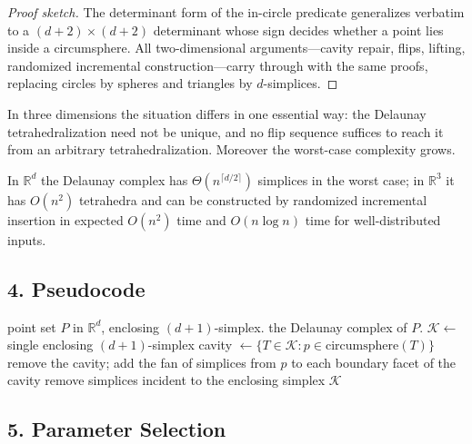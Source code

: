 \begin{proof}[Proof sketch]
The determinant form of the in-circle predicate generalizes verbatim to a
$(d+2) \times (d+2)$ determinant whose sign decides whether a point lies inside
a circumsphere. All two-dimensional arguments---cavity repair, flips, lifting,
randomized incremental construction---carry through with the same proofs,
replacing circles by spheres and triangles by $d$-simplices.
\end{proof}

In three dimensions the situation differs in one essential way: the Delaunay
tetrahedralization need not be unique, and no flip sequence suffices to reach
it from an arbitrary tetrahedralization. Moreover the worst-case complexity
grows.

\begin{theorem}\label{thm:high_dim_size}
In $\mathbb{R}^d$ the Delaunay complex has $\Theta(n^{\lceil d/2 \rceil})$
simplices in the worst case; in $\mathbb{R}^3$ it has $O(n^2)$ tetrahedra and
can be constructed by randomized incremental insertion in expected $O(n^2)$
time and $O(n \log n)$ time for well-distributed inputs.
\end{theorem}

\subsection{4. Pseudocode}

\begin{algorithm}[htbp]
\caption{Bowyer--Watson in Higher Dimensions}
\label{alg:delaunay_3d}
\begin{algorithmic}[1]
\Require point set $P$ in $\mathbb{R}^d$, enclosing $(d{+}1)$-simplex.
\Ensure the Delaunay complex of $P$.
  \State $\mathcal{K} \gets $ single enclosing $(d{+}1)$-simplex
    \State cavity $\gets \{ T \in \mathcal{K} : p \in \text{circumsphere}(T) \}$
    \State remove the cavity; add the fan of simplices from $p$ to each
           boundary facet of the cavity
  \EndFor
  \State remove simplices incident to the enclosing simplex
  \State \Return $\mathcal{K}$
\EndFunction
\end{algorithmic}
\end{algorithm}

\subsection{5. Parameter Selection}

